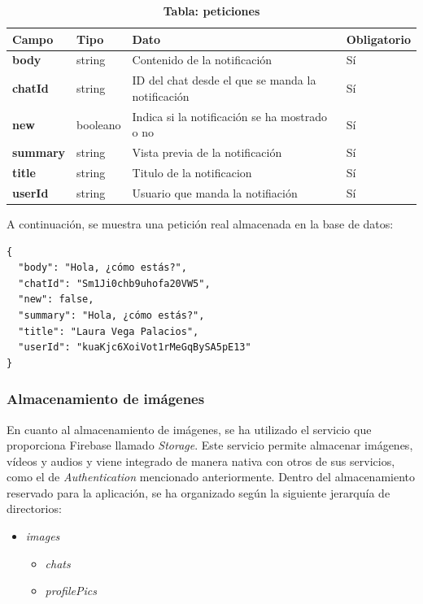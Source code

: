 \documentclass[a4paper, 12pt]{article}
\begin{document}
\begin{table}[H]
\captionsetup{justification=raggedright,singlelinecheck=false}
\captionsetup{labelformat=empty}
\caption{\textbf{Tabla: peticiones}}
\label{tab:users}
	\begin{tabular}{|m{3.2cm}|m{2cm}|m{5cm}|m{3cm}|}
	\hline
	\textbf{Campo} & \textbf{Tipo} & \textbf{Dato} & \textbf{Obligatorio} \\ 
	\hline
	\textbf{body} & string & Contenido de la notificación &  Sí \\ 
	\hline
	\textbf{chatId} & string &  ID del chat desde el que se manda la notificación &  Sí \\ 
	\hline
	\textbf{new} & booleano & Indica si la notificación se ha mostrado o no &  Sí \\ 
	\hline
	\textbf{summary} & string & Vista previa de la notificación &  Sí \\ 
	\hline
	\textbf{title} & string & Titulo de la notificacion &  Sí \\ 
	\hline
	\textbf{userId} & string & Usuario que manda la notifiación &  Sí \\ 
	\hline
	\end{tabular}
\end{table}

A continuación, se muestra una petición real almacenada en la base de datos:

\begin{verbatim}
{
  "body": "Hola, ¿cómo estás?",
  "chatId": "Sm1Ji0chb9uhofa20VW5",
  "new": false,
  "summary": "Hola, ¿cómo estás?",
  "title": "Laura Vega Palacios",
  "userId": "kuaKjc6XoiVot1rMeGqBySA5pE13"
}
\end{verbatim}

\subsubsection{Almacenamiento de imágenes}

En cuanto al almacenamiento de imágenes, se ha utilizado el servicio que proporciona Firebase llamado \textit{Storage}. Este servicio permite almacenar imágenes, vídeos y audios y viene integrado de manera nativa con otros de sus servicios, como el de \textit{Authentication} mencionado anteriormente. Dentro del almacenamiento reservado para la aplicación, se ha organizado según la siguiente jerarquía de directorios:

\begin{itemize}[noitemsep]
	\item \textit{images}
	\begin{itemize}[noitemsep]
		\item \textit{chats}
		\item \textit{profilePics}
	\end{itemize}
\end{itemize}
\end{document}
